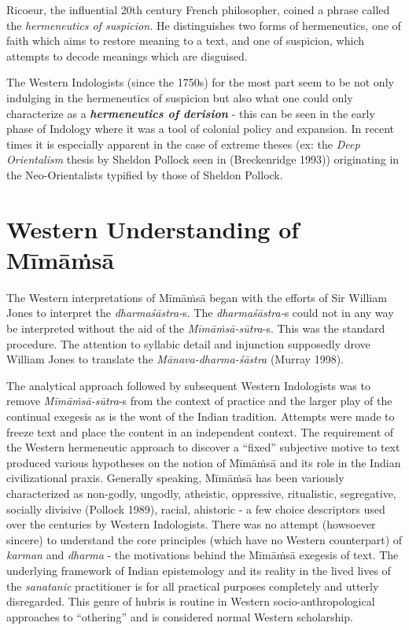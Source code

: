 Ricoeur, the influential 20th century French philosopher, coined a phrase called the \textit{hermeneutics of suspicion.} He distinguishes two forms of hermeneutics, one of faith which aims to restore meaning to a text, and one of suspicion, which attempts to decode meanings which are disguised.

The Western Indologists (since the 1750s) for the most part seem to be not only indulging in the hermeneutics of suspicion but also what one could only characterize as a \textbf{\textit{hermeneutics of derision}} - this can be seen in the early phase of Indology where it was a tool of colonial policy and expansion. In recent times it is especially apparent in the case of extreme theses (ex: the \textit{Deep Orientalism} thesis by Sheldon Pollock seen in (Breckenridge 1993)) originating in the Neo-Orientalists typified by those of Sheldon Pollock.


\section*{Western Understanding of Mīmāṁsā}

The Western interpretations of Mīmāṁsā began with the efforts of Sir William Jones to interpret the \textit{dharmaśāstra-}s. The \textit{dharmaśāstra-}s could not in any way be interpreted without the aid of the \textit{Mīmāṁsā-sūtra}-s. This was the standard procedure. The attention to syllabic detail and injunction supposedly drove William Jones to translate the \textit{Mānava-dharma-śāstra} (Murray 1998).

The analytical approach followed by subsequent Western Indologists was to remove \textit{Mīmāṁsā-sūtra}-s from the context of practice and the larger play of the continual exegesis as is the wont of the Indian tradition. Attempts were made to freeze text and place the content in an independent context. The requirement of the Western hermeneutic approach to discover a “fixed” subjective motive to text produced various hypotheses on the notion of Mīmāṁsā and its role in the Indian civilizational praxis. Generally speaking, Mīmāṁsā has been variously characterized as non-godly, ungodly, atheistic, oppressive, ritualistic, segregative, socially divisive (Pollock 1989), racial, ahistoric - a few choice descriptors used over the centuries by Western Indologists. There was no attempt (howsoever sincere) to understand the core principles (which have no Western counterpart) of \textit{karman} and \textit{dharma} - the motivations behind the Mīmāṁsā exegesis of text. The underlying framework of Indian epistemology and its reality in the lived lives of the \textit{sanatanic} practitioner is for all practical purposes completely and utterly disregarded. This genre of hubris is routine in Western socio-anthropological approaches to “othering” and is considered normal Western scholarship.

